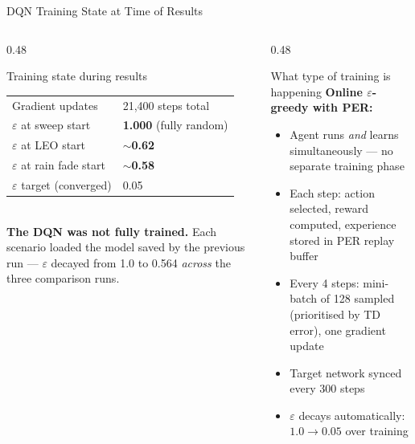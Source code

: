 \documentclass[aspectratio=169,10pt]{beamer}
\begin{document}
\begin{frame}[shrink=5]{DQN Training State at Time of Results}
\begin{columns}[T]
  \begin{column}{0.48\textwidth}
    \begin{alertblock}{Training state during results}
      \renewcommand{\arraystretch}{1.2}
      \begin{tabular}{ll}
        Gradient updates & 21{,}400 steps total \\
        $\varepsilon$ at sweep start & \textbf{1.000} (fully random) \\
        $\varepsilon$ at LEO start   & \textbf{$\sim$0.62} \\
        $\varepsilon$ at rain fade start & \textbf{$\sim$0.58} \\
        $\varepsilon$ target (converged) & 0.05 \\
      \end{tabular}
      \vspace{0.3em}\\
      \small\textbf{The DQN was not fully trained.} Each scenario loaded
      the model saved by the previous run — $\varepsilon$ decayed from
      1.0 to 0.564 \textit{across} the three comparison runs.
    \end{alertblock}
  \end{column}
  \begin{column}{0.48\textwidth}
    \begin{block}{What type of training is happening}
      \textbf{Online $\varepsilon$-greedy with PER:}
      \begin{itemize}\small
        \item Agent runs \textit{and} learns simultaneously — no separate training phase
        \item Each step: action selected, reward computed, experience stored in PER replay buffer
        \item Every 4 steps: mini-batch of 128 sampled (prioritised by TD error), one gradient update
        \item Target network synced every 300 steps
        \item $\varepsilon$ decays automatically: $1.0 \to 0.05$ over training
      \end{itemize}
    \end{block}
  \end{column}
\end{columns}


\end{frame}
\end{document}
